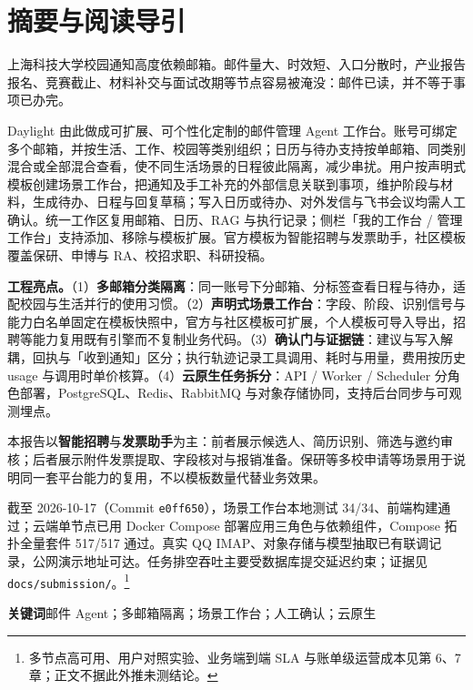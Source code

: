 \documentclass[UTF8,a4paper,zihao=5,fontset=fandol]{ctexart}
\begin{document}
\section*{摘要与阅读导引}
上海科技大学校园通知高度依赖邮箱。邮件量大、时效短、入口分散时，产业报告报名、竞赛截止、材料补交与面试改期等节点容易被淹没：邮件已读，并不等于事项已办完。

Daylight 由此做成可扩展、可个性化定制的邮件管理 Agent 工作台。账号可绑定多个邮箱，并按生活、工作、校园等类别组织；日历与待办支持按单邮箱、同类别混合或全部混合查看，使不同生活场景的日程彼此隔离，减少串扰。用户按声明式模板创建场景工作台，把通知及手工补充的外部信息关联到事项，维护阶段与材料，生成待办、日程与回复草稿；写入日历或待办、对外发信与飞书会议均需人工确认。统一工作区复用邮箱、日历、RAG 与执行记录；侧栏「我的工作台 / 管理工作台」支持添加、移除与模板扩展。官方模板为智能招聘与发票助手，社区模板覆盖保研、申博与 RA、校招求职、科研投稿。

\textbf{工程亮点。}（1）\textbf{多邮箱分类隔离}：同一账号下分邮箱、分标签查看日程与待办，适配校园与生活并行的使用习惯。（2）\textbf{声明式场景工作台}：字段、阶段、识别信号与能力白名单固定在模板快照中，官方与社区模板可扩展，个人模板可导入导出，招聘等能力复用既有引擎而不复制业务代码。（3）\textbf{确认门与证据链}：建议与写入解耦，回执与「收到通知」区分；执行轨迹记录工具调用、耗时与用量，费用按历史 usage 与调用时单价核算。（4）\textbf{云原生任务拆分}：API / Worker / Scheduler 分角色部署，PostgreSQL、Redis、RabbitMQ 与对象存储协同，支持后台同步与可观测埋点。

本报告以\textbf{智能招聘}与\textbf{发票助手}为主：前者展示候选人、简历识别、筛选与邀约审核；后者展示附件发票提取、字段核对与报销准备。保研等多校申请等场景用于说明同一套平台能力的复用，不以模板数量代替业务效果。

截至 2026-10-17（Commit \texttt{e0ff650}），场景工作台本地测试 34/34、前端构建通过；云端单节点已用 Docker Compose 部署应用三角色与依赖组件，Compose 拓扑全量套件 517/517 通过。真实 QQ IMAP、对象存储与模型抽取已有联调记录，公网演示地址可达。任务排空吞吐主要受数据库提交延迟约束；证据见 \texttt{docs/submission/}。\footnote{多节点高可用、用户对照实验、业务端到端 SLA 与账单级运营成本见第 6、7 章；正文不据此外推未测结论。}

\textbf{关键词}\quad 邮件 Agent；多邮箱隔离；场景工作台；人工确认；云原生
\end{document}
